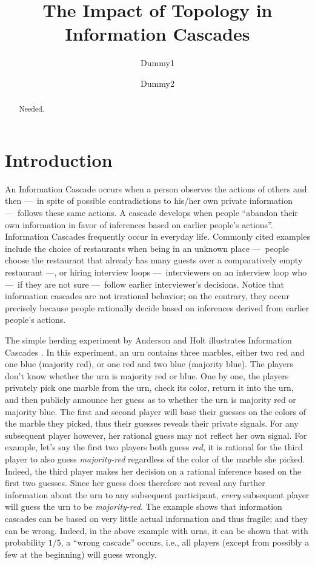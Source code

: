 \documentclass[a4paper,UKenglish]{lipics}
\title{The Impact of Topology in Information Cascades}
\author[1]{Dummy1}
\author[2]{Dummy2}
\affil[1]{Dummy University Computing Laboratory\\
  Address, Country\\
  \texttt{open@dummyuni.org}}
\affil[2]{Department of Informatics, Dummy College\\
  Address, Country\\
  \texttt{access@dummycollege.org}}
\theoremstyle{definition}
\begin{document}
\maketitle

\begin{abstract}
Needed.
\end{abstract}









\section{Introduction}

An Information Cascade occurs when a person observes the actions of others and then
	---~in spite of possible contradictions to his/her own private information
	---~follows these same actions. 
A cascade develops when people 
	``abandon their own information in favor of inferences based on earlier people's actions''\cite{easley2010networks}. 
Information Cascades frequently occur in everyday life. 
Commonly cited examples include the choice of restaurants when being in an unknown place
	---~people choose the restaurant that already has many guests over a comparatively empty restaurant
	---, or hiring interview loops
	---~interviewers on an interview loop who
	---~if they are not sure
	---~follow earlier interviewer's decisions. 
Notice that information cascades are not irrational behavior; 
	on the contrary, 
	they occur precisely because people rationally decide based on inferences derived from earlier people's actions.  

The simple herding experiment by Anderson and Holt illustrates Information Cascades \cite{anderson1996classroom, anderson1997information}. 
In this experiment, an urn contains three marbles, 
	either two red and one blue (majority red), 
	or one red and two blue (majority blue). 
The players don't know whether the urn is majority red or blue. 
One by one, the players privately pick one marble from the urn, 
	check its color, return it into the urn, 
	and then publicly announce her guess as to whether the urn is majority red or majority blue. 
The first and second player will base their guesses on the colors of the marble they picked, 
	thus their guesses reveals their private signals. 
For any subsequent player however, 
	her rational guess may not reflect her own signal. 
For example, let's say the first two players both guess \emph{red}, 
	it is rational for the third player to also guess \emph{majority-red} regardless of the color of the marble she picked. 
Indeed, the third player makes her decision on a rational inference based on the first two guesses. 
Since her guess does therefore not reveal any further information about the urn to any subsequent participant, 
	\emph{every} subsequent player will guess the urn to be \emph{majority-red}. 
The example shows that information cascades can be based on very little actual information and thus fragile; 
	and they can be wrong. 
Indeed, in the above example with urns, 
	it can be shown that with probability $1/5$, a ``wrong cascade'' occurs, 
	i.e., all players (except from possibly a few at the beginning) will guess wrongly.  
\end{document}
